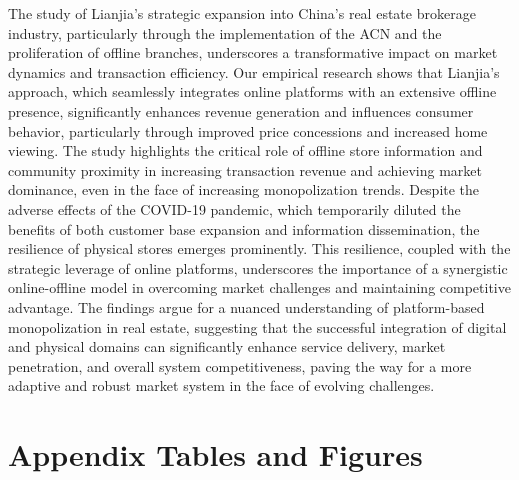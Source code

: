 \documentclass[12pt]{article}
\begin{document}
The study of Lianjia's strategic expansion into China's real estate brokerage industry, particularly through the implementation of the ACN and the proliferation of offline branches, underscores a transformative impact on market dynamics and transaction efficiency. Our empirical research shows that Lianjia's approach, which seamlessly integrates online platforms with an extensive offline presence, significantly enhances revenue generation and influences consumer behavior, particularly through improved price concessions and increased home viewing. The study highlights the critical role of offline store information and community proximity in increasing transaction revenue and achieving market dominance, even in the face of increasing monopolization trends. Despite the adverse effects of the COVID-19 pandemic, which temporarily diluted the benefits of both customer base expansion and information dissemination, the resilience of physical stores emerges prominently. This resilience, coupled with the strategic leverage of online platforms, underscores the importance of a synergistic online-offline model in overcoming market challenges and maintaining competitive advantage. The findings argue for a nuanced understanding of platform-based monopolization in real estate, suggesting that the successful integration of digital and physical domains can significantly enhance service delivery, market penetration, and overall system competitiveness, paving the way for a more adaptive and robust market system in the face of evolving challenges.

\clearpage
\begin{singlespace}
%
%


\end{singlespace}


\newpage
\appendix
\setcounter{table}{0}
\renewcommand{\tablename}{Appendix Table}
\renewcommand{\figurename}{Appendix Figure}
\renewcommand{\thetable}{A\arabic{table}}
\setcounter{figure}{0}
\renewcommand{\thefigure}{A\arabic{figure}}

\section{Appendix Tables and Figures}
% 
\end{document}
